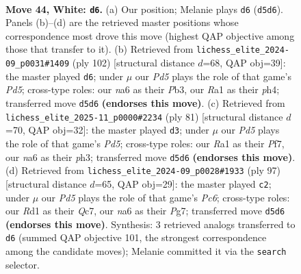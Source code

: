 \documentclass[11pt]{article}
\begin{document}
\clearpage

\begin{figure}[p]\centering
\begin{subfigure}{0.46\textwidth}\centering
\resizebox{\linewidth}{!}{%
\newchessgame
\chessboard[
  setfen={3r2k1/pp6/n6q/2pPQp2/8/P5P1/1P3K2/R2R4 w - - 6 44},
  showmover=false,
  pgfstyle=straightmove, color=movearrow, markmove={d5-d6}
]}
\caption{}
\end{subfigure}\hfill
\begin{subfigure}{0.46\textwidth}\centering
\resizebox{\linewidth}{!}{%
\newchessgame
\chessboard[
  setfen={8/k2r1p2/n5n1/p2P1R2/P6p/1PR2P2/3K4/8 w - - 0 52},
  showmover=false,
  pgfstyle=straightmove, color=movearrow, markmove={d5-d6}
]}
\caption{}
\end{subfigure}
\\[4pt]
\begin{subfigure}{0.46\textwidth}\centering
\resizebox{\linewidth}{!}{%
\newchessgame
\chessboard[
  setfen={3r2k1/2Q2p2/5qp1/1P6/3p3p/7P/5PP1/3R2K1 b - - 5 41},
  showmover=false,
  pgfstyle=straightmove, color=movearrow, markmove={d4-d3}
]}
\caption{}
\end{subfigure}\hfill
\begin{subfigure}{0.46\textwidth}\centering
\resizebox{\linewidth}{!}{%
\newchessgame
\chessboard[
  setfen={4Q3/1pq3pk/7p/b7/pr5P/2p2P2/6P1/2R4K b - - 2 49},
  showmover=false,
  pgfstyle=straightmove, color=movearrow, markmove={c3-c2}
]}
\caption{}
\end{subfigure}
\caption{\textbf{Move 44, White: \texttt{d6}.} (a) Our position; Melanie plays \texttt{d6} (\texttt{d5d6}). Panels (b)--(d) are the retrieved master positions whose correspondence most drove this move (highest QAP objective among those that transfer to it). (b) Retrieved from \texttt{lichess\_elite\_2024-09\_p0031\#1409} (ply 102) [structural distance $d$=68, QAP obj=39]: the master played \texttt{d6}; under $\mu$ our \emph{Pd5} plays the role of that game's \emph{Pd5}; cross-type roles: our \emph{n}a6 as their \emph{P}b3, our \emph{R}a1 as their \emph{p}h4; transferred move \texttt{d5d6} \textbf{(endorses this move)}. (c) Retrieved from \texttt{lichess\_elite\_2025-11\_p0000\#2234} (ply 81) [structural distance $d$=70, QAP obj=32]: the master played \texttt{d3}; under $\mu$ our \emph{Pd5} plays the role of that game's \emph{Pd5}; cross-type roles: our \emph{R}a1 as their \emph{P}f7, our \emph{n}a6 as their \emph{p}h3; transferred move \texttt{d5d6} \textbf{(endorses this move)}. (d) Retrieved from \texttt{lichess\_elite\_2024-09\_p0028\#1933} (ply 97) [structural distance $d$=65, QAP obj=29]: the master played \texttt{c2}; under $\mu$ our \emph{Pd5} plays the role of that game's \emph{Pc6}; cross-type roles: our \emph{R}d1 as their \emph{Q}c7, our \emph{n}a6 as their \emph{P}g7; transferred move \texttt{d5d6} \textbf{(endorses this move)}. Synthesis: 3 retrieved analogs transferred to \texttt{d6} (summed QAP objective 101, the strongest correspondence among the candidate moves); Melanie committed it via the \texttt{search} selector.}
\label{fig:thought-m86}
\end{figure}
\end{document}
